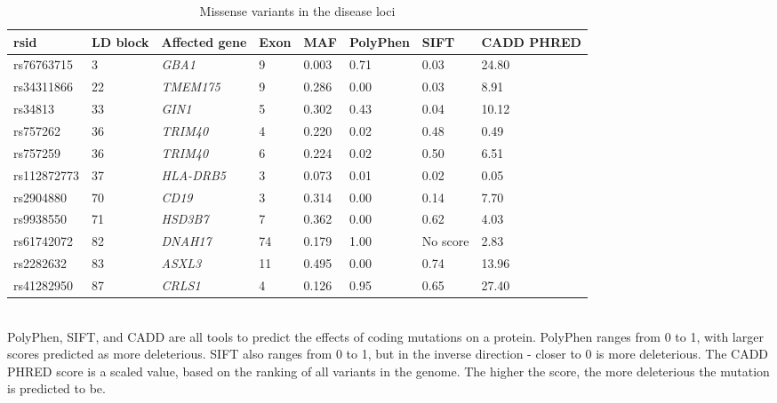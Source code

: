 \documentclass{article}
\begin{document}
\begin{table}[h]
\centering
\caption{Missense variants in the disease loci}
\label{tab:codingvariants}
\begin{tabular}{|l|l|l|l|l|l|l|l|}
\hline
rsid        & LD block & Affected gene & Exon & MAF   & PolyPhen & SIFT     & CADD PHRED \\ \hline
rs76763715  & 3        & \textit{GBA1}           & 9    & 0.003 & 0.71     & 0.03     & 24.80 \\ \hline
rs34311866  & 22       & \textit{TMEM175}       & 9    & 0.286 & 0.00     & 0.03     & 8.91  \\ \hline
rs34813     & 33       & \textit{GIN1}          & 5    & 0.302 & 0.43     & 0.04     & 10.12 \\ \hline
rs757262    & 36       & \textit{TRIM40}        & 4    & 0.220 & 0.02     & 0.48     & 0.49  \\ \hline
rs757259    & 36       & \textit{TRIM40}        & 6    & 0.224 & 0.02     & 0.50     & 6.51  \\ \hline
rs112872773 & 37       & \textit{HLA-DRB5}      & 3    & 0.073 & 0.01     & 0.02     & 0.05  \\ \hline
rs2904880   & 70       & \textit{CD19}         & 3    & 0.314 & 0.00     & 0.14     & 7.70  \\ \hline
rs9938550   & 71       & \textit{HSD3B7}        & 7    & 0.362 & 0.00     & 0.62     & 4.03  \\ \hline
rs61742072  & 82       & \textit{DNAH17}        & 74   & 0.179 & 1.00     & No score & 2.83  \\ \hline
rs2282632   & 83       & \textit{ASXL3}         & 11   & 0.495 & 0.00     & 0.74     & 13.96 \\ \hline
rs41282950  & 87       & \textit{CRLS1}         & 4    & 0.126 & 0.95     & 0.65     & 27.40 \\ \hline
\end{tabular}
\end{table}
\\PolyPhen\cite{Adzhubei2010AMutations}, SIFT\cite{Ng2001PredictingSubstitutions}, and CADD\cite{Schubach2024CADDPredictions} are all tools to predict the effects of coding mutations on a protein. PolyPhen ranges from 0 to 1, with larger scores predicted as more deleterious. SIFT also ranges from 0 to 1, but in the inverse direction - closer to 0 is more deleterious. The CADD PHRED score is a scaled value, based on the ranking of all variants in the genome. The higher the score, the more deleterious the mutation is predicted to be.
\end{document}
